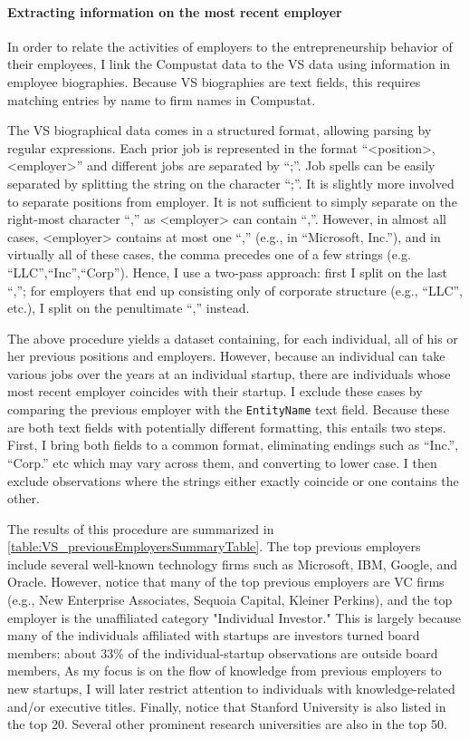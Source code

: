 \documentclass[11pt,english]{article}
\begin{document}


\paragraph{Extracting information on the most recent employer}

In order to relate the activities of employers to the entrepreneurship behavior of their employees, I link the Compustat data to the VS data using information in employee biographies. Because VS biographies are text fields, this requires matching entries by name to firm names in Compustat.  

The VS biographical data comes in a structured format, allowing parsing by regular expressions. Each prior job is represented in the format ``<position>, <employer>'' and different jobs are separated by ``;''. Job spells can be easily separated by splitting the string on the character ``;''. It is slightly more involved to separate positions from employer. It is not sufficient to simply separate on the right-most character ``,'' as <employer> can contain ``,''. However, in almost all cases, <employer> contains at most one ``,'' (e.g., in ``Microsoft, Inc.''), and in virtually all of these cases, the comma precedes one of a few strings (e.g. ``LLC'',``Inc'',``Corp''). Hence, I use a two-pass approach: first I split on the last ``,''; for employers that end up consisting only of corporate structure (e.g., ``LLC'', etc.), I split on the penultimate ``,'' instead. 

The above procedure yields a dataset containing, for each individual, all of his or her previous positions and employers. However, because an individual can take various jobs over the years at an individual startup, there are individuals whose most recent employer coincides with their startup. I exclude these cases by comparing the previous employer with the \texttt{EntityName} text field. Because these are both text fields with potentially different formatting, this entails two steps. First, I bring both fields to a common format, eliminating endings such as ``Inc.'', ``Corp.'' etc which may vary across them, and converting to lower case. I then exclude observations where the strings either exactly coincide or one contains the other. 

The results of this procedure are summarized in \autoref{table:VS_previousEmployersSummaryTable}. The top previous employers include several well-known technology firms such as Microsoft, IBM, Google, and Oracle. However, notice that many of the top previous employers are VC firms (e.g., New Enterprise Associates, Sequoia Capital, Kleiner Perkins), and the top employer is the unaffiliated category "Individual Investor." This is largely because many of the individuals affiliated with startups are investors turned board members: about 33\% of the individual-startup observations are outside board members, As my focus is on the flow of knowledge from previous employers to new startups, I will later restrict attention to individuals with knowledge-related and/or executive titles. Finally, notice that Stanford University is also listed in the top 20. Several other prominent research universities are also in the top 50. 
\end{document}
